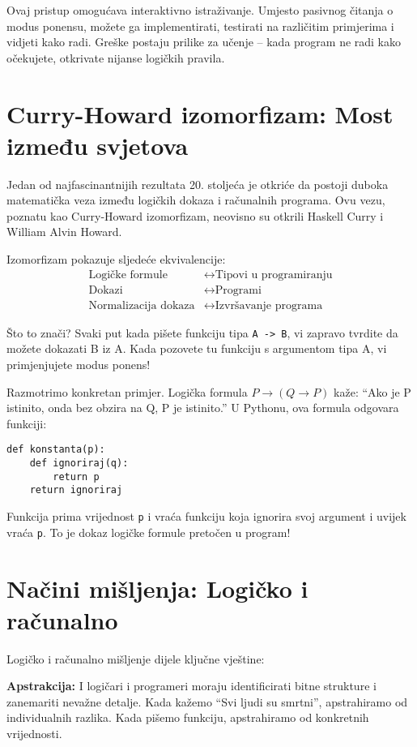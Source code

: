 Ovaj pristup omogućava interaktivno istraživanje. Umjesto pasivnog čitanja o modus ponensu, možete ga implementirati, testirati na različitim primjerima i vidjeti kako radi. Greške postaju prilike za učenje -- kada program ne radi kako očekujete, otkrivate nijanse logičkih pravila.

\section*{Curry-Howard izomorfizam: Most između svjetova}

Jedan od najfascinantnijih rezultata 20. stoljeća je otkriće da postoji duboka matematička veza između logičkih dokaza i računalnih programa. Ovu vezu, poznatu kao Curry-Howard izomorfizam, neovisno su otkrili Haskell Curry i William Alvin Howard.

Izomorfizam pokazuje sljedeće ekvivalencije:
\begin{align}
\text{Logičke formule} &\leftrightarrow \text{Tipovi u programiranju}\\
\text{Dokazi} &\leftrightarrow \text{Programi}\\
\text{Normalizacija dokaza} &\leftrightarrow \text{Izvršavanje programa}
\end{align}

Što to znači? Svaki put kada pišete funkciju tipa \texttt{A -> B}, vi zapravo tvrdite da možete dokazati B iz A. Kada pozovete tu funkciju s argumentom tipa A, vi primjenjujete modus ponens!

Razmotrimo konkretan primjer. Logička formula $P \rightarrow (Q \rightarrow P)$ kaže: ``Ako je P istinito, onda bez obzira na Q, P je istinito.'' U Pythonu, ova formula odgovara funkciji:
\begin{verbatim}
def konstanta(p):
    def ignoriraj(q):
        return p
    return ignoriraj
\end{verbatim}

Funkcija prima vrijednost \texttt{p} i vraća funkciju koja ignorira svoj argument i uvijek vraća \texttt{p}. To je dokaz logičke formule pretočen u program!

\section*{Načini mišljenja: Logičko i računalno}

Logičko i računalno mišljenje dijele ključne vještine:

\textbf{Apstrakcija:} I logičari i programeri moraju identificirati bitne strukture i zanemariti nevažne detalje. Kada kažemo ``Svi ljudi su smrtni'', apstrahiramo od individualnih razlika. Kada pišemo funkciju, apstrahiramo od konkretnih vrijednosti.

